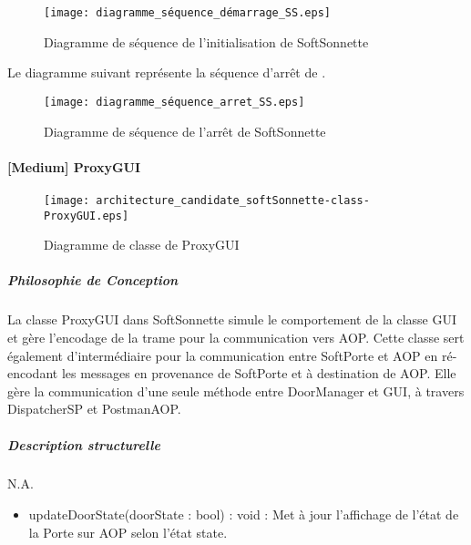         \begin{figure} [H]
            \centering
            \texttt{[image: diagramme\_séquence\_démarrage\_SS.eps]}
            \caption{Diagramme de séquence de l'initialisation de SoftSonnette}
            \label{Sequ-Demarrage-SS}
        \end{figure}
\newpage
        Le diagramme suivant représente la séquence d'arrêt de \appliLin.

        \begin{figure} [H]
            \centering
            \texttt{[image: diagramme\_séquence\_arret\_SS.eps]}
            \caption{Diagramme de séquence de l'arrêt de SoftSonnette}
            \label{Sequ-Arret-SS}
        \end{figure}

\newpage

    \paragraph{[Medium] ProxyGUI}

        \begin{figure} [H]
            \centering
            \texttt{[image: architecture\_candidate\_softSonnette-class-ProxyGUI.eps]}
            \caption{Diagramme de classe de ProxyGUI}
            \label{Classe-ProxyGUI}
        \end{figure}
        
        \subparagraph{Philosophie de Conception}%

        La classe ProxyGUI dans SoftSonnette simule le comportement de la classe GUI et gère l'encodage de la trame pour la communication vers AOP.
        Cette classe sert également d'intermédiaire pour la communication entre SoftPorte et AOP en ré-encodant les messages en provenance de SoftPorte et à destination de AOP. 
        Elle gère la communication d'une seule méthode entre DoorManager et GUI, à travers DispatcherSP et PostmanAOP.
        
        \subparagraph{Description structurelle}%

            N.A.
            \begin{itemize}
                \item {updateDoorState(doorState : bool) : void : Met à jour l'affichage de l'état de la Porte sur AOP selon l'état state.}
            \end{itemize}

